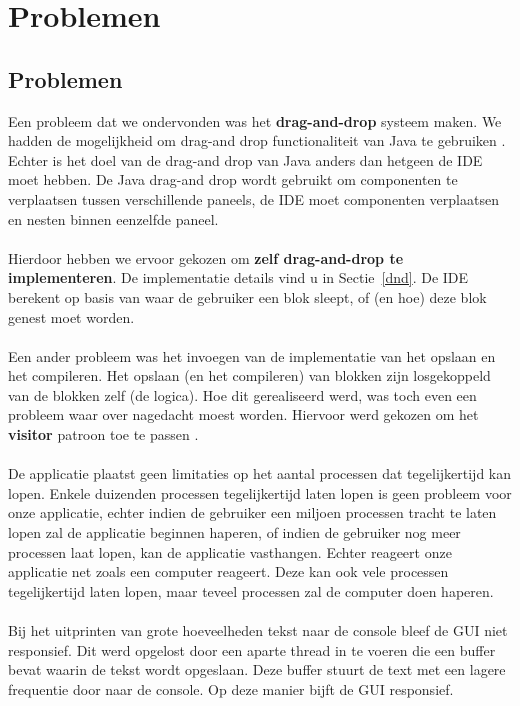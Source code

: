 \documentclass[]{article}
\begin{document}
\section{Problemen}
\subsection{Problemen}
\label{dndProbleem}
\label{visitor}
Een probleem dat we ondervonden was het \textbf{drag-and-drop} systeem maken. We hadden de mogelijkheid om drag-and drop functionaliteit van Java te gebruiken \cite{draganddrop}. Echter is het doel van de drag-and drop van Java anders dan hetgeen de IDE moet hebben. De Java drag-and drop wordt gebruikt om componenten te verplaatsen tussen verschillende paneels, de IDE moet componenten verplaatsen en nesten binnen eenzelfde paneel. \\\\
Hierdoor hebben we ervoor gekozen om \textbf{zelf drag-and-drop te implementeren}. De implementatie details vind u in Sectie~\ref{dnd}. De IDE berekent op basis van waar de gebruiker een blok sleept, of (en hoe) deze blok genest moet worden. \\\\
Een ander probleem was het invoegen van de implementatie van het opslaan en het compileren. Het opslaan (en het compileren) van blokken zijn losgekoppeld van de blokken zelf (de logica). Hoe dit gerealiseerd werd, was toch even een probleem waar over nagedacht moest worden. Hiervoor werd gekozen om het \textbf{visitor} patroon toe te passen \cite{Visitor}.\\\\
De applicatie plaatst geen limitaties op het aantal processen dat tegelijkertijd kan lopen. Enkele duizenden processen tegelijkertijd laten lopen is geen probleem voor onze applicatie, echter indien de gebruiker een miljoen processen tracht te laten lopen zal de applicatie beginnen haperen, of indien de gebruiker nog meer processen laat lopen, kan de applicatie vasthangen. Echter reageert onze applicatie net zoals een computer reageert. Deze kan ook vele processen tegelijkertijd laten lopen, maar teveel processen zal de computer doen haperen.\\\\
Bij het uitprinten van grote hoeveelheden tekst naar de console bleef de GUI niet responsief. Dit werd opgelost door een aparte thread in te voeren die een buffer bevat waarin de tekst wordt opgeslaan. Deze buffer stuurt de text met een lagere frequentie door naar de console. Op deze manier bijft de GUI responsief.
\end{document}
